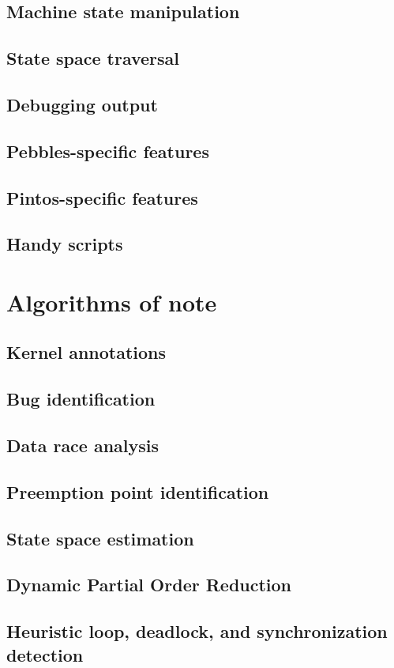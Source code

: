 \subsection{Machine state manipulation}
\subsection{State space traversal}
\subsection{Debugging output}
\subsection{Pebbles-specific features}
\subsection{Pintos-specific features}
\subsection{Handy scripts}

\section{Algorithms of note}

\subsection{Kernel annotations}
\subsection{Bug identification}
\subsection{Data race analysis}
\subsection{Preemption point identification}
\subsection{State space estimation}
\subsection{Dynamic Partial Order Reduction}
\subsection{Heuristic loop, deadlock, and synchronization detection}

